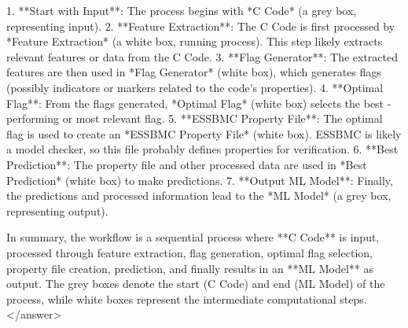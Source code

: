 1. **Start with Input**: The process begins with *C Code* (a grey box, representing input).  
2. **Feature Extraction**: The C Code is first processed by *Feature Extraction* (a white box, running process). This step likely extracts relevant features or data from the C Code.  
3. **Flag Generator**: The extracted features are then used in *Flag Generator* (white box), which generates flags (possibly indicators or markers related to the code’s properties).  
4. **Optimal Flag**: From the flags generated, *Optimal Flag* (white box) selects the best - performing or most relevant flag.  
5. **ESSBMC Property File**: The optimal flag is used to create an *ESSBMC Property File* (white box). ESSBMC is likely a model checker, so this file probably defines properties for verification.  
6. **Best Prediction**: The property file and other processed data are used in *Best Prediction* (white box) to make predictions.  
7. **Output ML Model**: Finally, the predictions and processed information lead to the *ML Model* (a grey box, representing output).  


In summary, the workflow is a sequential process where **C Code** is input, processed through feature extraction, flag generation, optimal flag selection, property file creation, prediction, and finally results in an **ML Model** as output. The grey boxes denote the start (C Code) and end (ML Model) of the process, while white boxes represent the intermediate computational steps.</answer>